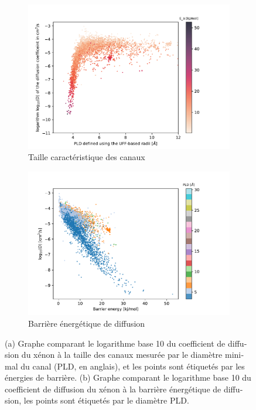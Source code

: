 \documentclass[thesis]{subfiles}
\begin{document}
\begin{otherlanguage}{french}
\begin{figure}[ht]
\centering
\begin{subfigure}[b]{0.48\textwidth}
    \centering
    \includegraphics[width=\textwidth]{figures/5-diffusion/difflog_Df-uff298K_barrier.pdf}
    \caption{Taille caractéristique des canaux}\label{fgr:barrier_diffusion_a_resume}
\end{subfigure}
\hfill
\begin{subfigure}[b]{0.48\textwidth}
    \centering
    \includegraphics[width=\textwidth]{figures/5-diffusion/difflog_barrier_Df_uff.pdf}
    \caption{Barrière énergétique de diffusion}\label{fgr:barrier_diffusion_b_resume}
\end{subfigure}
    \caption{ (a) Graphe comparant le logarithme base 10 du coefficient de diffusion du xénon à la taille des canaux mesurée par le diamètre minimal du canal (PLD, en anglais), et les points sont étiquetés par les énergies de barrière. (b) Graphe comparant le logarithme base 10 du coefficient de diffusion du xénon à la barrière énergétique de diffusion, les points sont étiquetés par le diamètre PLD. }\label{fgr:barrier_diffusion_resume}
\end{figure}


\end{otherlanguage}
\end{document}
